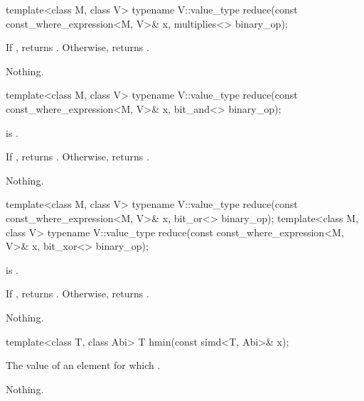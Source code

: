 \begin{itemdecl}
template<class M, class V>
  typename V::value_type reduce(const const_where_expression<M, V>& x, multiplies<> binary_op);
\end{itemdecl}

\begin{itemdescr}
  \pnum\returns
  If , returns . Otherwise, returns  \forallmaskedi.

  \pnum\throws Nothing.
\end{itemdescr}

\begin{itemdecl}
template<class M, class V>
  typename V::value_type reduce(const const_where_expression<M, V>& x, bit_and<> binary_op);
\end{itemdecl}

\begin{itemdescr}
  \pnum\requires
   is .

  \pnum\returns
  If , returns . Otherwise, returns  \forallmaskedi.

  \pnum\throws Nothing.
\end{itemdescr}

\begin{itemdecl}
template<class M, class V>
  typename V::value_type reduce(const const_where_expression<M, V>& x, bit_or<> binary_op);
template<class M, class V>
  typename V::value_type reduce(const const_where_expression<M, V>& x, bit_xor<> binary_op);
\end{itemdecl}

\begin{itemdescr}
  \pnum\requires
   is .

  \pnum\returns
  If , returns . Otherwise, returns  \forallmaskedi.

  \pnum\throws Nothing.
\end{itemdescr}

\begin{itemdecl}
template<class T, class Abi> T hmin(const simd<T, Abi>& x);
\end{itemdecl}

\begin{itemdescr}
  \pnum\returns
  The value of an element  for which  \foralli.

  \pnum\throws Nothing.

\end{itemdescr}

